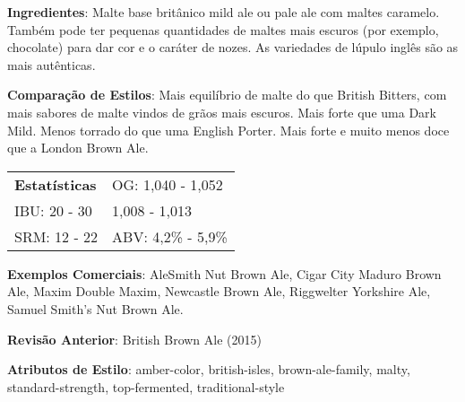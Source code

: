\textbf{Ingredientes}: Malte base britânico mild ale ou pale ale com maltes caramelo. Também pode ter pequenas quantidades de maltes mais escuros (por exemplo, chocolate) para dar cor e o caráter de nozes. As variedades de lúpulo inglês são as mais autênticas.

\textbf{Comparação de Estilos}: Mais equilíbrio de malte do que British Bitters, com mais sabores de malte vindos de grãos mais escuros. Mais forte que uma Dark Mild. Menos torrado do que uma English Porter. Mais forte e muito menos doce que a London Brown Ale.

\begin{tabular}{@{}p{35mm}p{35mm}@{}}
  \textbf{Estatísticas} & OG: 1,040 - 1,052 \\
  IBU: 20 - 30  & 1,008 - 1,013  \\
  SRM: 12 - 22  & ABV: 4,2\% - 5,9\%
\end{tabular}

\textbf{Exemplos Comerciais}: AleSmith Nut Brown Ale, Cigar City Maduro Brown Ale, Maxim Double Maxim, Newcastle Brown Ale, Riggwelter Yorkshire Ale, Samuel Smith’s Nut Brown Ale.

\textbf{Revisão Anterior}: British Brown Ale (2015)

\textbf{Atributos de Estilo}: amber-color, british-isles, brown-ale-family, malty, standard-strength, top-fermented, traditional-style
